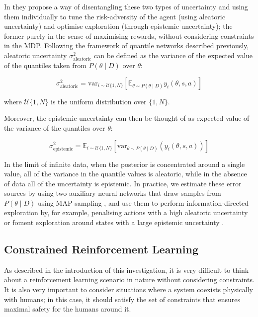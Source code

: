 \documentclass[12pt,twoside]{report}
\begin{document}
\smallskip

In \cite{risk-uncertainty} they propose a way of disentangling these two types of uncertainty and using them individually to tune the risk-adversity of the agent (using aleatoric uncertainty) and optimise exploration (through epistemic uncertainty); the former purely in the sense of maximising rewards, without considering constraints in the MDP. Following the framework of quantile networks described previously, aleatoric uncertainty $\sigma_\text{aleatoric}^2$ can be defined as the variance of the expected value of the quantiles taken from $P(\theta \! \mid \! D)$ over $\theta$: 

\begin{equation}
    \sigma_\text{aleatoric}^2 = \text{var}_{i \sim \mathcal{U}\{1,N\}} [\mathbb{E}_{\theta \sim P(\theta \mid D)} y_i (\theta,s,a) ]
\end{equation}

\noindent where $\mathcal{U}\{1,N\}$ is the uniform distribution over $\{1,N\}$. 

Moreover, the epistemic uncertainty can then be thought of as expected value of the variance of the quantiles over $\theta$: 

\begin{equation}
    \sigma_\text{epistemic}^2 = \mathbb{E}_{i \sim \mathcal{U}\{1,N\}} [\text{var}_{\theta \sim P(\theta \mid D)} (y_i (\theta,s,a)) ]
\end{equation}

In the limit of infinite data, when the posterior is concentrated around a single value, all of the variance in the quantile values is aleatoric, while in the absence of data all of the uncertainty is epistemic. In practice, we estimate these error sources by using two auxiliary neural networks that draw samples from $P(\theta \! \mid \! D)$ using MAP sampling \cite{map-sampling}, and use them to perform information-directed exploration by, for example, penalising actions with a high aleatoric uncertainty or foment exploration around states with a large epistemic uncertainty \cite{risk-uncertainty}.

\subsection{Constrained Reinforcement Learning}

As described in the introduction of this investigation, it is very difficult to think about a reinforcement learning scenario in nature without considering constraints. It is also very important to consider situations where a system coexists physically with humans; in this case, it should satisfy the set of constraints that ensures maximal safety for the humans around it. 
\end{document}
